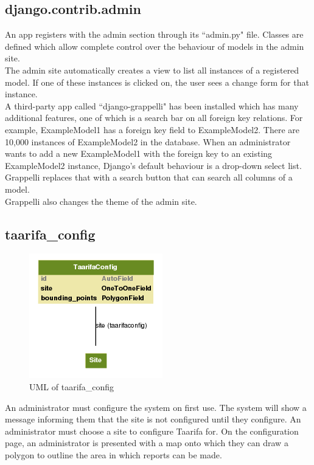 \subsection{django.contrib.admin}
An app registers with the admin section through its ``admin.py" file. Classes are defined which allow complete control over the behaviour of models in the admin site. \\

The admin site automatically creates a view to list all instances of a registered model. If one of these instances is clicked on, the user sees a change form for that instance. \\

A third-party app called ``django-grappelli" has been installed which has many additional features, one of which is a search bar on all foreign key relations. For example, ExampleModel1 has a foreign key field to ExampleModel2. There are 10,000 instances of ExampleModel2 in the database. When an administrator wants to add a new ExampleModel1 with the foreign key to an existing ExampleModel2 instance, Django's default behaviour is a drop-down select list. Grappelli replaces that with a search button that can search all columns of a model. \\

Grappelli also changes the theme of the admin site.

\subsection{taarifa\_config}
\begin{figure}
\centering
\includegraphics[scale=0.51]{img/config.png}
\caption{UML of taarifa\_config}
\label{fig:taarifa_config}
\end{figure}
An administrator must configure the system on first use. The system will show a message informing them that the site is not configured until they configure. An administrator must choose a site to configure Taarifa for. On the configuration page, an administrator is presented with a map onto which they can draw a polygon to outline the area in which reports can be made. \\

